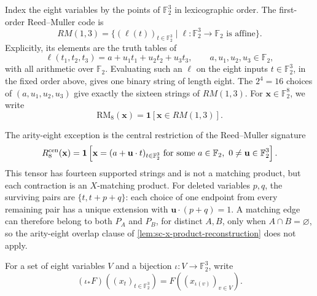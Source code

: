 \documentclass[11pt,letterpaper,onecolumn]{article}
\theoremstyle{plain}
\theoremstyle{definition}
\theoremstyle{remark}
\newcommand{\Ftwo}{\mathbb F_2}
\newcommand{\one}{\mathbf 1}
\newcommand{\RMcore}{\mathrm{RM}_8}
\begin{document}
	Index the eight variables by the points of \(\Ftwo^3\) in lexicographic order.
	The first-order Reed--Muller code is
	\[
	RM(1,3)
	=
	\{(\ell(t))_{t\in\Ftwo^3}\mid
	\ell\colon\Ftwo^3\to\Ftwo\text{ is affine}\}.
	\]
	Explicitly, its elements are the truth tables of
	\[
	\ell(t_1,t_2,t_3)
	=a+u_1t_1+u_2t_2+u_3t_3,
	\qquad
	a,u_1,u_2,u_3\in\Ftwo,
	\]
	with all arithmetic over \(\Ftwo\).  Evaluating such an \(\ell\) on the
	eight inputs \(t\in\Ftwo^3\), in the fixed order above, gives one binary
	string of length eight.  The \(2^4=16\) choices of
	\((a,u_1,u_2,u_3)\) give exactly the sixteen strings of \(RM(1,3)\).
	For \({\mathbf x}\in\Ftwo^8\), we write
	\begin{equation}
		\RMcore({\mathbf x})=\one[{\mathbf x}\in RM(1,3)].
		\label{eq:RM-core}
	\end{equation}
	
	The arity-eight exception is the central restriction of the Reed--Muller signature
	\begin{equation}
	R_8^{\rm cen}({\mathbf x})=
	\one\left[{\mathbf x}=(a+{\mathbf u}\cdot t)_{t\in\Ftwo^3}
	\text{ for some }a\in\Ftwo,\ 0\ne {\mathbf u}\in\Ftwo^3\right].
	\label{eq:auto-wt-20}
	\end{equation}
	This tensor has fourteen supported strings and is not a matching product, but each contraction
	is an \(X\)-matching product.  For deleted variables \(p,q\), the surviving pairs are
	\(\{t,t+p+q\}\): each choice of one endpoint from every remaining pair
	has a unique extension with
	\({\mathbf u}\cdot(p+q)=1\).  A matching edge can therefore belong to both \(P_A\) and \(P_B\),
	for distinct \(A,B\), only when \(A\cap B=\varnothing\), so the arity-eight overlap clause of
	\cref{lem:sc-x-product-reconstruction} does not apply.
	
	For a set of eight variables \(V\) and a bijection \(\iota:V\to\Ftwo^3\), write
	\[
	(\iota_*F)((x_t)_{t\in\Ftwo^3})
	=F((x_{\iota(v)})_{v\in V}).
	\]
	
\end{document}
